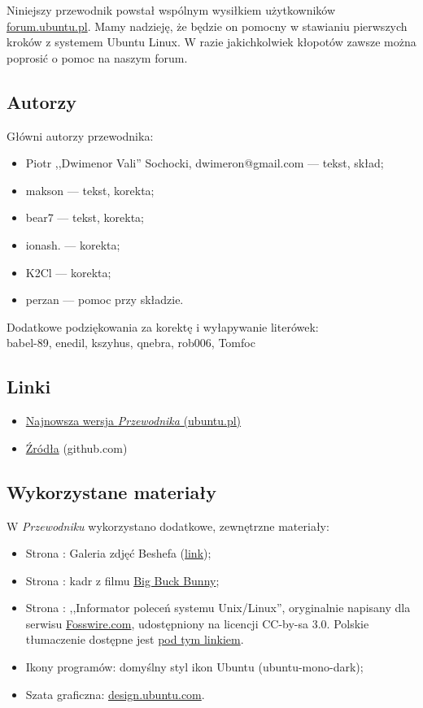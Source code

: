 Niniejszy przewodnik powstał wspólnym wysiłkiem użytkowników \href{http://ubuntu.pl/forum/}{forum.ubuntu.pl}. Mamy nadzieję, że będzie on pomocny w stawianiu pierwszych kroków z systemem Ubuntu Linux. W razie jakichkolwiek kłopotów zawsze można poprosić o pomoc na naszym forum.

\subsection{Autorzy}
Główni autorzy przewodnika:
\begin{itemize}
\item Piotr ,,Dwimenor Vali'' Sochocki, dwimeron@gmail.com --- tekst, skład;
\item makson --- tekst, korekta;
\item bear7 --- tekst, korekta;
\item ionash. --- korekta;
\item K2Cl --- korekta;
\item perzan --- pomoc przy składzie.
\end{itemize}

Dodatkowe podziękowania za korektę i wyłapywanie literówek:\\
babel-89, enedil, kszyhus, qnebra, rob006, Tomfoc

\subsection{Linki}
\begin{itemize}
\item \href{http://ubuntu.pl/dokumenty/Przewodnik_Ubuntu_14.04_LTS_Trusty_Tahr.pdf}{Najnowsza wersja \textit{Przewodnika} (ubuntu.pl)}
\item \href{https://github.com/Dwimenor/Przewodnik-Ubuntu-14.04-LTS-Trusty-Tahr}{Źródła} (github.com)
\end{itemize}

\subsection{Wykorzystane materiały}
W \textit{Przewodniku} wykorzystano dodatkowe, zewnętrzne materiały:
\begin{itemize}
\item Strona \pageref{shotwell}: Galeria zdjęć Beshefa (\href{https://www.flickr.com/photos/sharif/sets/72157600223985436/}{link});
\item Strona \pageref{totem}: kadr z filmu \href{http://www.bigbuckbunny.org}{Big Buck Bunny};
\item Strona \pageref{polecenia}: ,,Informator poleceń systemu Unix/Linux'', oryginalnie napisany dla serwisu \href{http://fosswire.com/}{Fosswire.com}, udostępniony na licencji CC-by-sa 3.0. Polskie tłumaczenie dostępne jest \href{http://czytelnia.ubuntu.pl/index.php/2012/02/24/wydrukuj-i-powies-kolo-monitora-informator-polecen-systemu-unixlinux/}{pod tym linkiem}.
\item Ikony programów: domyślny styl ikon Ubuntu (ubuntu-mono-dark);
\item Szata graficzna: \href{http://design.ubuntu.com/}{design.ubuntu.com}.
\end{itemize}

